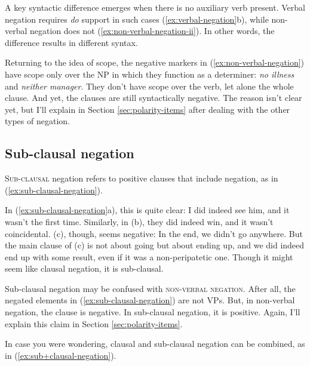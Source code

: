 A key syntactic difference emerges when there is no auxiliary verb present. Verbal negation requires \textit{do} support in such cases (\ref{ex:verbal-negation}b), while non-verbal negation does not (\ref{ex:non-verbal-negation-ii}). In other words, the difference results in different syntax.

Returning to the idea of scope, the negative markers in (\ref{ex:non-verbal-negation}) have scope only over the NP in which they function as a determiner: \textit{no illness} and \textit{neither manager}. They don't have scope over the verb, let alone the whole clause. And yet, the clauses are still syntactically negative. The reason isn't clear yet, but I'll explain in Section \ref{sec:polarity-items} after dealing with the other types of negation.

\subsection{Sub-clausal negation}

\textsc{Sub-clausal} negation refers to positive clauses that include negation, as in (\ref{ex:sub-clausal-negation}).

\ea \label{ex:sub-clausal-negation}
    \z
\z

In (\ref{ex:sub-clausal-negation}a), this is quite clear: I did indeed see him, and it wasn't the first time. Similarly, in (b), they did indeed win, and it wasn't coincidental. (c), though, seems negative: In the end, we didn't go anywhere. But the main clause of (c) is not about going but about ending up, and we did indeed end up with some result, even if it was a non-peripatetic one. Though it might seem like clausal negation, it is sub-clausal.

Sub-clausal negation may be confused with \textsc{non-verbal negation}. After all, the negated elements in (\ref{ex:sub-clausal-negation}) are not VPs. But, in non-verbal negation, the clause is negative. In sub-clausal negation, it is positive. Again, I'll explain this claim in Section \ref{sec:polarity-items}.

In case you were wondering, clausal and sub-clausal negation can be combined, as in (\ref{ex:sub+clausal-negation}).

 \label{ex:sub+clausal-negation}
\z

